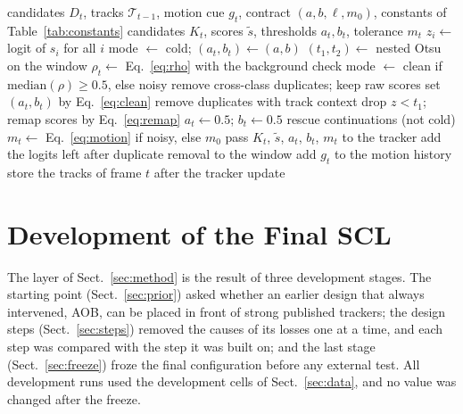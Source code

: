 \documentclass[pdflatex,sn-mathphys-num,iicol]{sn-jnl}
\newcommand{\scl}{SCL}
\newcommand{\aob}{AOB}
\begin{document}
\begin{algorithm}[t]
\caption{\scl{} for frame $t$. The window holds the logits of frames
$t-W$ to $t-1$, so the decision for frame $t$ uses no future frame.}\label{alg:layer}
\begin{algorithmic}[1]
\Require candidates $D_t$, tracks $\mathcal{T}_{t-1}$, motion cue $g_t$, contract $(a,b,\ell,m_0)$, constants of Table~\ref{tab:constants}
\Ensure candidates $K_t$, scores $\tilde{s}$, thresholds $a_t,b_t$, tolerance $m_t$
\State $z_i\gets$ logit of $s_i$ for all $i$ 
 
  \State mode $\gets$ cold; $(a_t,b_t)\gets(a,b)$
\Else
  \State $(t_1,t_2)\gets$ nested Otsu on the window 
  \State $\rho_t\gets$ Eq.~\eqref{eq:rho} with the background check
  \State mode $\gets$ clean if $\mathrm{median}(\rho)\ge0.5$, else noisy
\EndIf
{} 
  \State remove cross-class duplicates; keep raw scores
   set $(a_t,b_t)$ by Eq.~\eqref{eq:clean}
  \EndIf
\Else {}
  \State remove duplicates with track context
  \State drop $z<t_1$; remap scores by Eq.~\eqref{eq:remap}
  \State $a_t\gets0.5$; $b_t\gets0.5$
\EndIf
\State rescue continuations (not cold) 
\State $m_t\gets$ Eq.~\eqref{eq:motion} if noisy, else $m_0$
\State pass $K_t$, $\tilde{s}$, $a_t$, $b_t$, $m_t$ to the tracker
\State add the logits left after duplicate removal to the window
\State add $g_t$ to the motion history
\State store the tracks of frame $t$ after the tracker update
\end{algorithmic}
\end{algorithm}
\section{Development of the Final SCL}\label{sec:development}

The layer of Sect.~\ref{sec:method} is the result of three development stages. The starting point
(Sect.~\ref{sec:prior}) asked whether an earlier design that always intervened, \aob{}, can be
placed in front of strong published trackers; the design steps (Sect.~\ref{sec:steps}) removed the
causes of its losses one at a time, and each step was compared with the step it was built on; and
the last stage (Sect.~\ref{sec:freeze}) froze the final configuration before any external test.
All development runs used the development cells of Sect.~\ref{sec:data}, and no value was changed
after the freeze.
\end{document}

